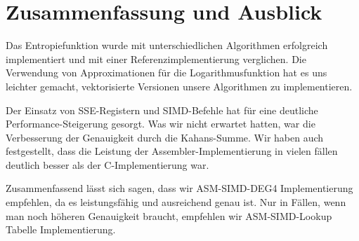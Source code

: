 \section{Zusammenfassung und Ausblick}
Das Entropiefunktion wurde mit unterschiedlichen Algorithmen erfolgreich implementiert und mit einer Referenzimplementierung verglichen. Die Verwendung von Approximationen für die Logarithmusfunktion hat es uns leichter gemacht, vektorisierte Versionen unsere Algorithmen zu implementieren.

Der Einsatz von SSE-Registern und SIMD-Befehle hat für eine deutliche Performance-Steigerung gesorgt.  Was wir nicht erwartet hatten, war die Verbesserung der Genauigkeit durch die Kahans-Summe. Wir haben auch festgestellt, dass die Leistung der Assembler-Implementierung in vielen fällen deutlich besser als der C-Implementierung war.

Zusammenfassend lässt sich sagen, dass wir ASM-SIMD-DEG4 Implementierung empfehlen, da es leistungsfähig und ausreichend genau ist. Nur in Fällen, wenn man noch höheren Genauigkeit braucht, empfehlen wir ASM-SIMD-Lookup Tabelle Implementierung.

\newpage